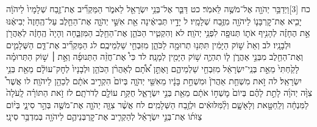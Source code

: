 \documentclass[twoside, openany, parskip=half, 11pt]{book}
\begin{document}
כח ‏[3]וַיְדַבֵּ֥ר יְהֹוָ֖ה אֶל־מֹשֶׁ֥ה לֵּאמֹֽר׃ כט דַּבֵּ֛ר אֶל־בְּנֵ֥י יִשְׂרָאֵ֖ל לֵאמֹ֑ר הַמַּקְרִ֞יב אֶת־זֶ֤בַח שְׁלָמָיו֙ לַיהֹוָ֔ה יָבִ֧יא אֶת־קׇרְבָּנ֛וֹ לַיהֹוָ֖ה מִזֶּ֥בַח שְׁלָמָֽיו׃ ל יָדָ֣יו תְּבִיאֶ֔ינָה אֵ֖ת אִשֵּׁ֣י יְהֹוָ֑ה אֶת־הַחֵ֤לֶב עַל־הֶֽחָזֶה֙ יְבִיאֶ֔נּוּ אֵ֣ת הֶחָזֶ֗ה לְהָנִ֥יף אֹת֛וֹ תְּנוּפָ֖ה לִפְנֵ֥י יְהֹוָֽה׃ לא וְהִקְטִ֧יר הַכֹּהֵ֛ן אֶת־הַחֵ֖לֶב הַמִּזְבֵּ֑חָה וְהָיָה֙ הֶֽחָזֶ֔ה לְאַהֲרֹ֖ן וּלְבָנָֽיו׃ לב וְאֵת֙ שׁ֣וֹק הַיָּמִ֔ין תִּתְּנ֥וּ תְרוּמָ֖ה לַכֹּהֵ֑ן מִזִּבְחֵ֖י שַׁלְמֵיכֶֽם׃ לג הַמַּקְרִ֞יב אֶת־דַּ֧ם הַשְּׁלָמִ֛ים וְאֶת־הַחֵ֖לֶב מִבְּנֵ֣י אַהֲרֹ֑ן ל֧וֹ תִהְיֶ֛ה שׁ֥וֹק הַיָּמִ֖ין לְמָנָֽה׃ לד כִּי֩ אֶת־חֲזֵ֨ה הַתְּנוּפָ֜ה וְאֵ֣ת ׀ שׁ֣וֹק הַתְּרוּמָ֗ה לָקַ֙חְתִּי֙ מֵאֵ֣ת בְּנֵֽי־יִשְׂרָאֵ֔ל מִזִּבְחֵ֖י שַׁלְמֵיהֶ֑ם וָאֶתֵּ֣ן אֹ֠תָ֠ם לְאַהֲרֹ֨ן הַכֹּהֵ֤ן וּלְבָנָיו֙ לְחׇק־עוֹלָ֔ם מֵאֵ֖ת בְּנֵ֥י יִשְׂרָאֵֽל׃ לה זֹ֣את מִשְׁחַ֤ת אַהֲרֹן֙ וּמִשְׁחַ֣ת בָּנָ֔יו מֵאִשֵּׁ֖י יְהֹוָ֑ה בְּיוֹם֙ הִקְרִ֣יב אֹתָ֔ם לְכַהֵ֖ן לַיהֹוָֽה׃ לו אֲשֶׁר֩ צִוָּ֨ה יְהֹוָ֜ה לָתֵ֣ת לָהֶ֗ם בְּיוֹם֙ מׇשְׁח֣וֹ אֹתָ֔ם מֵאֵ֖ת בְּנֵ֣י יִשְׂרָאֵ֑ל חֻקַּ֥ת עוֹלָ֖ם לְדֹרֹתָֽם׃ לז זֹ֣את הַתּוֹרָ֗ה לָֽעֹלָה֙ לַמִּנְחָ֔ה וְלַֽחַטָּ֖את וְלָאָשָׁ֑ם וְלַ֨מִּלּוּאִ֔ים וּלְזֶ֖בַח הַשְּׁלָמִֽים׃ לח אֲשֶׁ֨ר צִוָּ֧ה יְהֹוָ֛ה אֶת־מֹשֶׁ֖ה בְּהַ֣ר סִינָ֑י בְּי֨וֹם צַוֺּת֜וֹ אֶת־בְּנֵ֣י יִשְׂרָאֵ֗ל לְהַקְרִ֧יב אֶת־קׇרְבְּנֵיהֶ֛ם לַיהֹוָ֖ה בְּמִדְבַּ֥ר סִינָֽי׃
\end{document}
